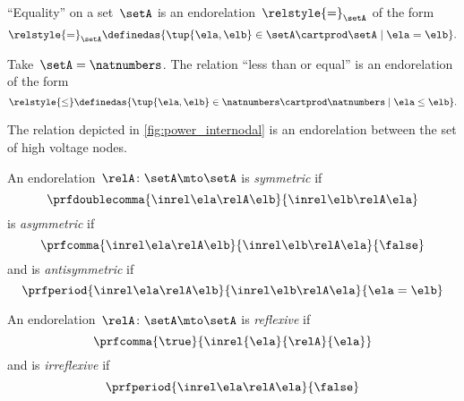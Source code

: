 \begin{example}
    ``Equality'' on a set~$\setA$ is an endorelation~$\relstyle{=}_\setA$ of the form
    \begin{equation}
        \relstyle{=}_\setA \definedas \{\tup{\ela,\elb}\in \setA\cartprod \setA \mid \ela=\elb\}.
    \end{equation}
\end{example}

\begin{example}
    Take~$\setA=\natnumbers$.
    The relation ``less than or equal'' is an endorelation of the form
    \begin{equation}
        \relstyle{\leq} \definedas  \{\tup{\ela,\elb}\in \natnumbers\cartprod \natnumbers\mid \ela \leq \elb\}.
    \end{equation}
\end{example}

\begin{example}
    The relation depicted in \cref{fig:power_internodal} is an endorelation between the set of high voltage nodes.
\end{example}

\begin{ctdefinition}
    \label{def:endo_sym_asym_antisym}
    \label{def:antisymmetry}
    An endorelation~$\relA\colon \setA\mto \setA$ is \emph{symmetric} if
    \begin{equation}
        \prfdoublecomma{
            \inrel \ela \relA \elb
        }{
            \inrel \elb \relA \ela
        }
    \end{equation}
    is \emph{asymmetric} if
    \begin{equation}
        \prfcomma{
            \inrel \ela \relA \elb
        }{
            \inrel \elb \relA \ela
        }{
            \false
        }
    \end{equation}
    and is \emph{antisymmetric} if
    \begin{equation}
        \prfperiod{
            \inrel \ela \relA \elb
        }{
            \inrel \elb \relA \ela
        }{
            \ela = \elb
        }
    \end{equation}
\end{ctdefinition}

\begin{ctdefinition}
    \label{def:endo_reflexive_irreflexive}
    An endorelation~$\relA\colon \setA\mto \setA$ is \emph{reflexive} if
    \begin{equation}
        \prfcomma{\true}{\inrel{\ela}{\relA}{\ela}}
    \end{equation}
    and is \emph{irreflexive} if
    \begin{equation}
        \prfperiod{
            \inrel \ela \relA \ela
        }{
            \false
        }
    \end{equation}
\end{ctdefinition}

